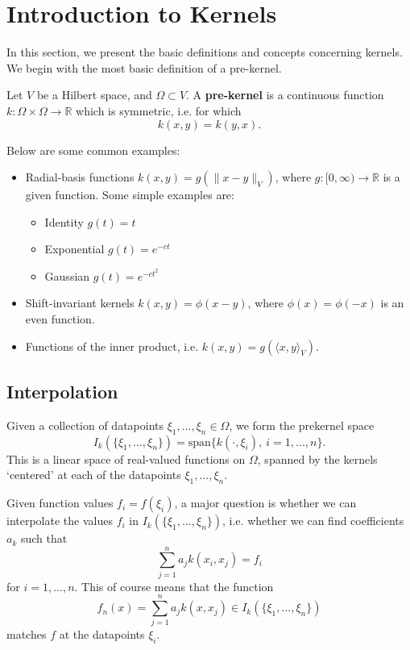 \section{Introduction to Kernels}
In this section, we present the basic definitions and concepts concerning kernels. We begin with the most basic definition of a pre-kernel.
\begin{definition}
Let $V$ be a Hilbert space, and $\Omega\subset V$. A \textbf{pre-kernel} is a continuous function $k:\Omega\times \Omega \rightarrow \mathbb{R}$ which is symmetric, i.e. for which
\begin{equation}
 k(x,y) = k(y,x).
\end{equation}

\end{definition}
Below are some common examples:
\begin{itemize}
 \item Radial-basis functions $k(x,y) = g(\|x-y\|_V)$, where $g:[0,\infty)\rightarrow \mathbb{R}$ is a given function. Some simple examples are:
 \begin{itemize}
 \item Identity $g(t) = t$
 \item Exponential $g(t) = e^{-ct}$
 \item Gaussian $g(t) = e^{-ct^2}$
 \end{itemize}
 \item Shift-invariant kernels $k(x,y) = \phi(x-y)$, where $\phi(x) = \phi(-x)$ is an even function.
 \item Functions of the inner product, i.e. $k(x,y) = g(\langle x, y\rangle_V)$.
\end{itemize}

\subsection{Interpolation}
Given a collection of datapoints $\xi_1,...,\xi_n\in \Omega$, we form the prekernel space
\begin{equation}
 I_k(\{\xi_1,...,\xi_n\}) = \text{span}\{k(\cdot, \xi_i),~i=1,...,n\}.
\end{equation}
This is a linear space of real-valued functions on $\Omega$, spanned by the kernels `centered' at each of the datapoints $\xi_1,...,\xi_n$.

Given function values $f_i = f(\xi_i)$, a major question is whether we can interpolate the values $f_i$ in $I_k(\{\xi_1,...,\xi_n\})$, i.e. whether we can find coefficients $a_k$ such that
\begin{equation}
 \sum_{j=1}^n a_jk(x_i,x_j) = f_i
\end{equation}
for $i=1,...,n$. This of course means that the function
$$f_n(x) = \sum_{j=1}^n a_jk(x,x_j)\in I_k(\{\xi_1,...,\xi_n\})$$
matches $f$ at the datapoints $\xi_i$.

